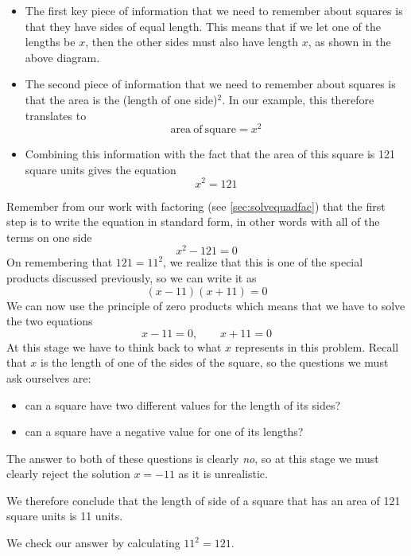 \begin{myProof}
	\begin{itemize}
		\item The first key piece of information that we need to remember about squares
		is that they have sides of equal length. This means that if we let one of
		the lengths be $x$, then the other sides must also have length $x$, as shown in the
		above diagram.
		\item The second piece of information that we need to remember about squares is that the area is
		the (length of one side)$^2$. In our example, this therefore translates to
		\[
			{\mathrm{area~of~square} = x^2}
		\]
		\item Combining this information with the fact that the area of this square is 121 square units gives
		the equation
		\[
			x^2=121
		\]	
	\end{itemize} 
	Remember from our work with factoring (see \cref{sec:solvequadfac}) that the first step is to write the equation in standard form, in
	other words with all of the terms on one side
	\[
		x^2-121=0
	\]
	On remembering that $121=11^2$, we realize that this is one of the special products discussed previously, so we can write it as
	\[
		(x-11)(x+11)=0
	\]
	We can now use the principle of zero products which means that we have to solve the two equations
	\[
		x-11=0, \qquad x+11=0
	\]
	At this stage we have to think back to what $x$ represents in this problem. Recall that $x$ is the length
	of one of the sides of the square, so the questions we must ask ourselves are:
	\begin{itemize}
		\item can a square have two different values for the length of its sides?
		\item can a square have a negative value for one of its lengths?
	\end{itemize}
	The answer to both of these questions is clearly {\em no}, so at this stage we must clearly reject the solution $x=-11$ as it is unrealistic.
				
	We therefore conclude that the length of side of a square that has an area of 121 square units is 11 units. 
				
	We check our answer by calculating $11^2=121$.
	{}
\end{myProof}

